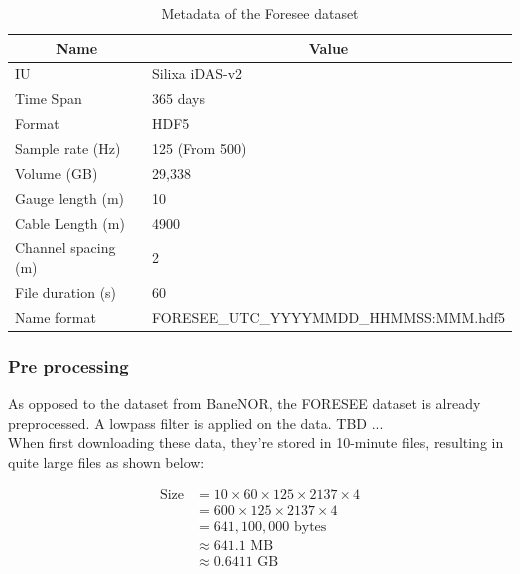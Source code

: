 \begin{table}[h]
    \small
    \centering
    \begin{tabular}{|l|l|}
    \toprule
    \multicolumn{1}{|c|}{\textbf{Name}} & \multicolumn{1}{c|}{\textbf{Value}} \\ \hline
    IU                                  & Silixa iDAS-v2                      \\ \hline
    Time Span                           & 365 days                            \\ \hline
    Format                              & HDF5                                \\ \hline
    Sample rate (Hz)                    & 125 (From 500)                      \\ \hline
    Volume (GB)                         & 29,338                              \\ \hline
    Gauge length (m)                    & 10                                  \\ \hline
    Cable Length (m)                    & 4900                                \\ \hline
    Channel spacing (m)                 & 2                                   \\ \hline
    File duration (s)                   & 60                                  \\ \hline
    Name format                         & FORESEE\_UTC\_YYYYMMDD\_HHMMSS:MMM.hdf5 \\ 
    \bottomrule
    \end{tabular}
    \caption{Metadata of the Foresee dataset}
    \label{tab:foresee_meta}
\end{table}

\subsubsection{Pre processing}

As opposed to the dataset from BaneNOR, the FORESEE dataset is already preprocessed. A lowpass filter is applied on the data. TBD ... \\

When first downloading these data, they're stored in 10-minute files, resulting in quite large files as shown below:

\begin{align*}
\text{Size} &= 10 \times 60 \times 125 \times 2137 \times 4 \\
&= 600 \times 125 \times 2137 \times 4 \\
&= 641,100,000 \text{ bytes} \\
&\approx 641.1 \text{ MB} \\
&\approx 0.6411 \text{ GB}
\end{align*}

